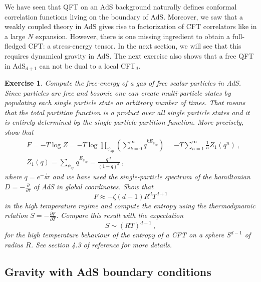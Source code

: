 \documentclass{ws-rv9x6}
\newtheorem{exercise}{Exercise}[section]
\newcommand\be{\begin{equation}}
\newcommand\ee{\end{equation}}
\begin{document}
We have seen that QFT on an AdS background naturally defines conformal 
correlation functions living on the boundary of AdS. Moreover, we saw that a weakly coupled theory
in AdS gives rise to factorization of CFT correlators like in a large
$N$ expansion. However, there is one missing ingredient to obtain
a full-fledged CFT: a stress-energy tensor. In the next section, we
will see that this requires dynamical gravity in AdS. The next exercise
also shows that a free QFT in AdS$_{d+1}$ can not be dual to a local
CFT$_{d}$. 
\begin{exercise}
Compute the free-energy of a gas of free scalar particles
in AdS. Since particles are free and bosonic one can create multi-particle
states by populating each single particle state an arbitrary number
of times. That means that the total partition function is a product
over all single particle states and it is entirely determined by the
single particle partition function. More precisely, show that 
\begin{align}
&F=-T\log Z=-T\log\prod_{\psi_{sp}}\left(\sum_{k=0}^{\infty}q^{kE_{\psi_{sp}}}\right)=-T\sum_{n=1}^{\infty}\frac{1}{n}Z_{1}\left(q^{n}\right)\ ,\\
&Z_{1}(q)=\sum_{\psi_{sp}}q^{E_{\psi_{sp}}}=\frac{q^{\Delta}}{(1-q)^{d}}\ ,
\end{align}
where $q=e^{-\frac{1}{RT}}$ and we have used the single-particle spectrum
of the hamiltonian $D=-\frac{\partial}{\partial\tau}$ of AdS in global
coordinates. Show that
\be
F\approx-\zeta(d+1)R^dT^{d+1}
\ee
in the high temperature regime and compute the entropy using the thermodynamic
relation $S=-\frac{\partial F}{\partial T}$. Compare this result
with the expectation 
\be
S\sim(RT)^{d-1}\ ,
\ee
for the high temperature behaviour of the entropy of a CFT on a sphere
$S^{d-1}$ of radius $R$. See section 4.3 of reference \cite{arXiv:1101.4163}
for more details.
\end{exercise}


\subsection{Gravity with AdS boundary conditions\label{sub:GravityAdS}}
\end{document}
